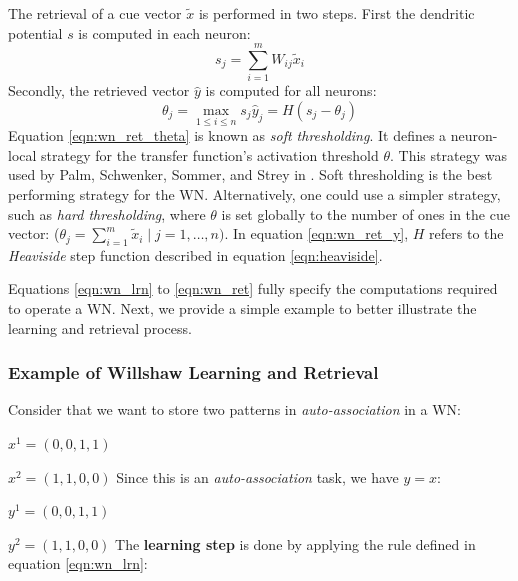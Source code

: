 \documentclass{article}
\begin{document}
The retrieval of a cue vector $\tilde{x}$ is performed in two steps. First the dendritic potential $s$ is computed in each neuron:
\begin{equation}
\label{eqn:dendritic}
    s_{j}=\sum_{i=1}^{m} W_{i j} \tilde{x}_{i}
\end{equation}
Secondly, the retrieved vector $\hat{y}$ is computed for all neurons:
\begin{subequations}
\label{eqn:wn_ret}
\begin{equation}
    \theta_{j}=\max _{1 \leq i \leq n} s_j
\label{eqn:wn_ret_theta}
\end{equation}
\begin{equation}
\label{eqn:wn_ret_y}
    \hat{y}_{j}=H\left(s_{j}-\theta_{j}\right)
\end{equation}
\end{subequations}
Equation \ref{eqn:wn_ret_theta} is known as\textit{ soft thresholding}. It defines a neuron-local strategy for the transfer function's activation threshold $\theta$. This strategy was used by Palm, Schwenker, Sommer, and Strey in \cite{palm1992information, gunther1997neural}. Soft thresholding is the best performing strategy for the WN. Alternatively, one could use a simpler strategy, such as \textit{hard thresholding}, where $\theta$ is set globally to the number of ones in the cue vector: ($\theta_j=\sum_{i=1}^{m} \tilde{x}_i \mid j=1, \dots , n)$.
In equation \ref{eqn:wn_ret_y}, $H$ refers to the \textit{Heaviside} step function described in equation \ref{eqn:heaviside}.

Equations \ref{eqn:wn_lrn} to \ref{eqn:wn_ret} fully specify the computations required to operate a WN. Next, we provide a simple example to better illustrate the learning and retrieval process.
\newpage
\subsubsection{Example of Willshaw Learning and Retrieval}

Consider that we want to store two patterns in \textit{auto-association} in a WN:

$x^{1} = (0,0,1,1)$

$x^{2} = (1,1,0,0)$
\newline
Since this is an \textit{auto-association} task, we have $y=x$:

$y^{1} = (0,0,1,1)$

$y^{2} = (1,1,0,0)$
\newline
\newline
The \textbf{learning step} is done by applying the rule defined in equation \ref{eqn:wn_lrn}:
\newline
\end{document}
